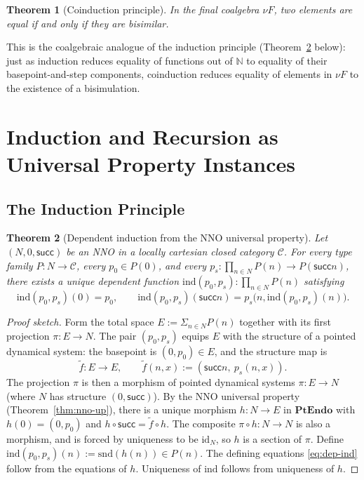 \documentclass[12pt]{article}
\newtheorem{theorem}{Theorem}[section]
\theoremstyle{definition}
\theoremstyle{remark}
\newcommand{\N}{\mathbb{N}}
\newcommand{\id}{\mathrm{id}}
\newcommand{\suc}{\mathsf{succ}}
\newcommand{\PtEndo}{\mathbf{PtEndo}}
\begin{document}
\begin{theorem}[Coinduction principle]
\label{thm:coind}
In the final coalgebra $\nu F$, two elements are equal if and only if they are bisimilar.
\end{theorem}

This is the coalgebraic analogue of the induction principle (Theorem~\ref{thm:induction-from-up} below): just as induction reduces equality of functions out of $\N$ to equality of their basepoint-and-step components, coinduction reduces equality of elements in $\nu F$ to the existence of a bisimulation.

\section{Induction and Recursion as Universal Property Instances}
\label{sec:induction}

\subsection{The Induction Principle}

\begin{theorem}[Dependent induction from the NNO universal property]
\label{thm:induction-from-up}
Let $(N, 0, \suc)$ be an NNO in a locally cartesian closed category $\mathcal{C}$. For every type family $P \colon N \to \mathcal{C}$, every $p_0 \in P(0)$, and every $p_s \colon \prod_{n \in N} P(n) \to P(\suc n)$, there exists a unique dependent function $\mathrm{ind}(p_0, p_s) \colon \prod_{n \in N} P(n)$ satisfying
\begin{equation}
\mathrm{ind}(p_0, p_s)(0) = p_0, \qquad \mathrm{ind}(p_0, p_s)(\suc n) = p_s\bigl(n, \mathrm{ind}(p_0, p_s)(n)\bigr).
\label{eq:dep-ind}
\end{equation}
\end{theorem}

\begin{proof}[Proof sketch]
Form the total space $E := \Sigma_{n \in N} P(n)$ together with its first projection $\pi \colon E \to N$. The pair $(p_0, p_s)$ equips $E$ with the structure of a pointed dynamical system: the basepoint is $(0, p_0) \in E$, and the structure map is
\[
\widetilde{f} \colon E \to E, \qquad \widetilde{f}(n, x) := (\suc n,\ p_s(n, x)).
\]
The projection $\pi$ is then a morphism of pointed dynamical systems $\pi \colon E \to N$ (where $N$ has structure $(0, \suc)$). By the NNO universal property (Theorem~\ref{thm:nno-up}), there is a unique morphism $h \colon N \to E$ in $\PtEndo$ with $h(0) = (0, p_0)$ and $h \circ \suc = \widetilde{f} \circ h$. The composite $\pi \circ h \colon N \to N$ is also a morphism, and is forced by uniqueness to be $\id_N$, so $h$ is a section of $\pi$. Define $\mathrm{ind}(p_0, p_s)(n) := \mathrm{snd}(h(n)) \in P(n)$. The defining equations \eqref{eq:dep-ind} follow from the equations of $h$. Uniqueness of $\mathrm{ind}$ follows from uniqueness of $h$.
\end{proof}
\end{document}
